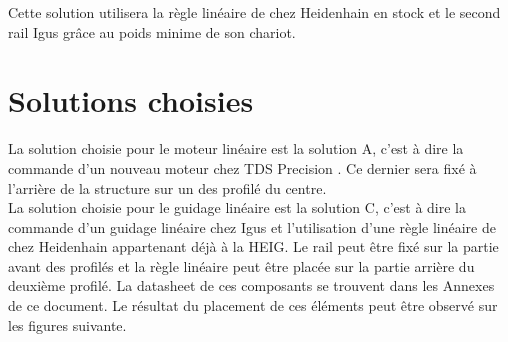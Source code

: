 \begin{table}[H]
    \centering
    \caption{Offres pour le guidage}
    \label{tab:OffreGuid2}
\end{table}

Cette solution utilisera la règle linéaire de chez Heidenhain en stock et le second rail Igus grâce au poids minime de son chariot.

\section{Solutions choisies}\label{sec:SolChoix}

La solution choisie pour le moteur linéaire est la solution A, c'est à dire la commande d'un nouveau moteur chez TDS Precision \cite{TDSPrecisionProducts}. Ce dernier
sera fixé à l'arrière de la structure sur un des profilé du centre.\\

La solution choisie pour le guidage linéaire est la solution C, c'est à dire la commande d'un guidage linéaire chez Igus \cite{Igus} et l'utilisation d'une
règle linéaire de chez Heidenhain \cite{Heidenhain} appartenant déjà à la HEIG. Le rail peut être fixé sur la partie avant des profilés et la règle linéaire peut
être placée sur la partie arrière du deuxième profilé. La datasheet de ces composants se trouvent dans les Annexes de ce document. Le résultat du placement de ces
éléments peut être observé sur les figures suivante.

